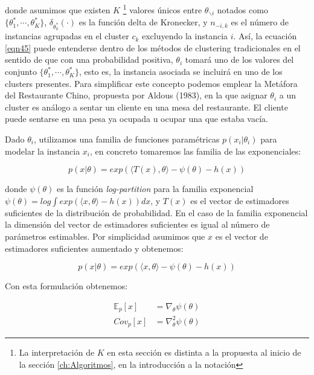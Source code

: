 donde asumimos que existen $K$ \footnote{La interpretación de $K$ en esta sección es distinta a la propuesta al inicio de la sección \ref{ch:Algoritmos}, en la introducción a la notación} valores únicos entre $\theta_{\backslash i}$ notados como $\{\theta_{1}^*, \cdots, \theta_{K}^*\}$, $\delta_{\theta_{k}^*}(\cdot)$ es la función delta de Kronecker, y $n_{-i,k}$ es el número de instancias agrupadas en el cluster $c_k$ excluyendo la instancia $i$. Así, la ecuación \ref{eqn45} puede entenderse dentro de los métodos de clustering tradicionales en el sentido de que con una probabilidad positiva, $\theta_i$ tomará uno de los valores del conjunto $\{\theta_{1}^*, \cdots, \theta_{K}^*\}$, esto es, la instancia asociada se incluirá en uno de los clusters presentes. Para simplificar este concepto podemos emplear la Metáfora del Restaurante Chino, propuesta por Aldous (1983), en la que asignar $\theta_i$ a un cluster es análogo a sentar un cliente en una mesa del restaurante. El cliente puede sentarse en una pesa ya ocupada u ocupar una que estaba vacía.

Dado $\theta_i$, utilizamos una familia de funciones paramétricas $p(x_i|\theta_i)$ para modelar la instancia $x_i$, en concreto tomaremos las familia de las exponenciales:

\begin{equation}
p(x|\theta) = exp(\langle T(x), \theta \rangle - \psi(\theta) - h(x))
\label{eqn46}
\end{equation}

donde $\psi(\theta)$ es la función \textit{log-partition} para la familia exponencial $\psi(\theta) = log \int exp(\langle x, \theta \rangle - h(x))dx$, y $T(x)$ es el vector de estimadores suficientes de la distribución de probabilidad. En el caso de la familia exponencial la dimensión del vector de estimadores suficientes es igual al número de parámetros estimables. Por simplicidad asumimos que $x$ es el vector de estimadores suficientes aumentado y obtenemos:

\begin{equation}
p(x|\theta) = exp(\langle x, \theta \rangle - \psi(\theta) - h(x))
\label{eqn47}
\end{equation}

Con esta formulación obtenemos:

\begin{equation}
\begin{split}
\mathbb{E}_p[x] &= \nabla_{\theta} \psi(\theta) \\
Cov_p[x] &= \nabla_{\theta}^2 \psi(\theta)
\end{split}
\label{eqn48}
\end{equation}

